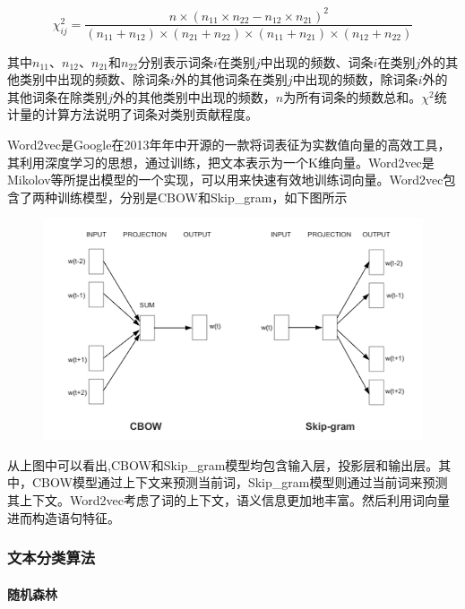 \documentclass{article}
\begin{document}
\[
\chi_{ij}^2=\frac{n\times (n_{11}\times n_{22}-n_{12}\times n_{21})^2}{(n_{11}+n_{12})\times (n_{21}+n_{22})\times (n_{11}+n_{21})\times (n_{12}+n_{22})}
\]

其中\(n_{11}、n_{12}、n_{21}\)和\(n_{22}\)分别表示词条\(i\)在类别\(j\)中出现的频数、词条\(i\)在类别\(j\)外的其他类别中出现的频数、除词条\(i\)外的其他词条在类别\(j\)中出现的频数，除词条\(i\)外的其他词条在除类别\(j\)外的其他类别中出现的频数，\(n\)为所有词条的频数总和。\(\chi^2\)统计量的计算方法说明了词条对类别贡献程度。

Word2vec是Google在2013年年中开源的一款将词表征为实数值向量的高效工具，其利用深度学习的思想，通过训练，把文本表示为一个K维向量。Word2vec是Mikolov等所提出模型的一个实现，可以用来快速有效地训练词向量。Word2vec包含了两种训练模型，分别是CBOW和Skip\_gram，如下图所示

\begin{figure}[htbp]
\centering
\includegraphics{./images/word2vec.png}
\caption{}
\end{figure}

从上图中可以看出,CBOW和Skip\_gram模型均包含输入层，投影层和输出层。其中，CBOW模型通过上下文来预测当前词，Skip\_gram模型则通过当前词来预测其上下文。Word2vec考虑了词的上下文，语义信息更加地丰富。然后利用词向量进而构造语句特征。

\subsubsection{文本分类算法}\label{ux6587ux672cux5206ux7c7bux7b97ux6cd5}

\paragraph{随机森林}\label{ux968fux673aux68eeux6797}
\end{document}
